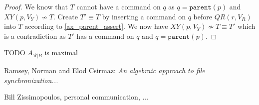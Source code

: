 \documentclass[12pt]{article}
\newcommand{\parent}{\mathtt{parent}}
\newcommand{\fscommand}[2]{{#1#2}}
\newcommand{\cxy}{\fscommand{X}{Y}}
\newcommand{\cqr}{\fscommand{Q}{R}}
\newcommand{\indep}{\not\sim}
\newcommand{\recchar}[3]{{#1}^{#3}_{\mathcal{R}|{#2}}}
\newcommand{\reca}{\recchar{A}{B}{}} %
\theoremstyle{definition}
\begin{document}
\begin{proof}
We know that $T$ cannot have a command on $q$ as $q=\parent(p)$ and $\cxy(p,V_Y)\indep T$.
Create $T'\equiv T$ by inserting a command on $q$ before $\cqr(r,V_R)$
into $T$ according to \cref{ax_parent_assert}.
We now have $\cxy(p,V_Y)\indep T\equiv T'$ which is a contradiction as
$T'$ has a command on $q$ and $q=\parent(p)$.
\end{proof}

TODO $\reca$ is maximal

\begin{thebibliography}{99}

 Ramsey, Norman and Elod Csirmaz: {\it An algebraic approach to
file synchronization...}

 Bill Zissimopoulos, personal communication, ...

\end{thebibliography}
\end{document}
